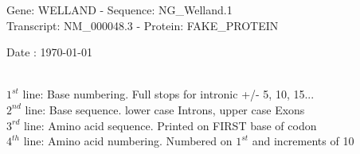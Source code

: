 \documentclass{article}
\begin{document}
\renewcommand{\footrulewidth}{1pt}
\renewcommand{\headrulewidth}{0pt}
\begin{center}
\begin{large}
Gene: WELLAND - Sequence: NG\_Welland.1\\
Transcript: NM\_000048.3 - Protein: FAKE\_PROTEIN
 
 Date : \today\\\\
\end{large}
\end{center}
$1^{st}$ line: Base numbering. Full stops for intronic +/- 5, 10, 15...\\
$2^{nd}$ line: Base sequence. lower case Introns, upper case Exons\\
$3^{rd}$ line: Amino acid sequence. Printed on FIRST base of codon\\
$4^{th}$ line: Amino acid numbering. Numbered on $1^{st}$ and increments of 10\\
\end{document}
